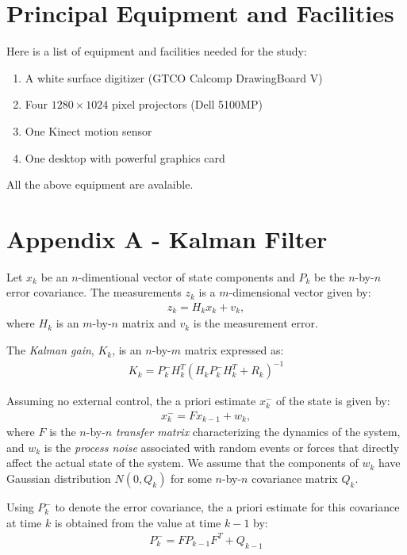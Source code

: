 \section{Principal Equipment and Facilities}
Here is a list of equipment and facilities needed for the study:

\begin{enumerate}
  \item A white surface digitizer (GTCO Calcomp DrawingBoard V)
  \item Four $1280\times1024$ pixel projectors (Dell 5100MP)
  \item One Kinect motion sensor
  \item One desktop with powerful graphics card
\end{enumerate}

All the above equipment are avalaible.

\section{Appendix A - Kalman Filter}
Let $x_k$ be an $n$-dimentional vector of state components and $P_k$ be the
$n$-by-$n$ error covariance. The measurements $z_k$ is a $m$-dimensional
vector given by:
\begin{align*}
z_k = H_kx_k + v_k,
\end{align*}
where $H_k$ is an $m$-by-$n$ matrix and $v_k$ is the measurement error.

The \textit{Kalman gain}, $K_k$, is an $n$-by-$m$ matrix expressed as:
\begin{align*}
K_k = P_k^-H_k^T(H_kP_k^-H_k^T + R_k)^{-1}
\end{align*}

Assuming no external control, the a priori estimate $x_k^-$ of the state is
given by:
\begin{align*}
x_k^- = Fx_{k - 1} + w_k,
\end{align*}
where $F$ is the $n$-by-$n$ \textit{transfer matrix} characterizing the
dynamics of the system, and $w_k$ is the \textit{process noise} associated with
random events or forces that directly affect the actual state of the system. We assume that the components of $w_k$
have Gaussian distribution $N(0, Q_k)$ for some $n$-by-$n$ covariance matrix
$Q_k$.

Using $P_k^-$ to denote the error covariance, the a priori estimate for this
covariance at time $k$ is obtained from the value at time $k - 1$ by:
\begin{align*}
P_k^- = FP_{k - 1}F^T + Q_{k - 1}
\end{align*}

